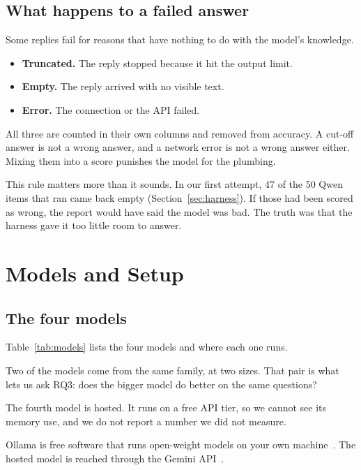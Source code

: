 \documentclass[11pt,a4paper]{article}
\begin{document}
\subsection{What happens to a failed answer}

Some replies fail for reasons that have nothing to do with the model's knowledge.

\begin{itemize}
  \item \textbf{Truncated.} The reply stopped because it hit the output limit.
  \item \textbf{Empty.} The reply arrived with no visible text.
  \item \textbf{Error.} The connection or the API failed.
\end{itemize}

All three are counted in their own columns and removed from accuracy. A cut-off answer is not a wrong answer, and a network error is not a wrong answer either. Mixing them into a score punishes the model for the plumbing.

This rule matters more than it sounds. In our first attempt, 47 of the 50 Qwen items that ran came back empty (Section~\ref{sec:harness}). If those had been scored as wrong, the report would have said the model was bad. The truth was that the harness gave it too little room to answer.

\section{Models and Setup}

\subsection{The four models}



Table~\ref{tab:models} lists the four models and where each one runs.

Two of the models come from the same family, at two sizes. That pair is what lets us ask RQ3: does the bigger model do better on the same questions?

The fourth model is hosted. It runs on a free API tier, so we cannot see its memory use, and we do not report a number we did not measure.

Ollama is free software that runs open-weight models on your own machine~\cite{ollama}. The hosted model is reached through the Gemini API~\cite{geminidocs}.
\end{document}
